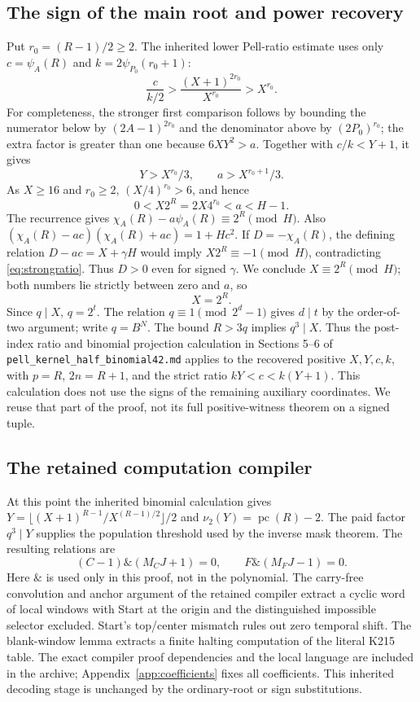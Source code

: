 \documentclass[11pt,a4paper]{article}
\theoremstyle{remark}\newtheorem{remark}[theorem]{Remark}
\newcommand{\pc}{\operatorname{pc}}
\newcommand{\src}[1]{\nolinkurl{#1}}
\begin{document}
\subsection{The sign of the main root and power recovery}
Put $r_0=(R-1)/2\ge2$. The inherited lower Pell-ratio estimate
uses only $c=\psi_A(R)$ and $k=2\psi_{P_0}(r_0+1)$:
\[
 \frac{c}{k/2}>
 \frac{(X+1)^{2r_0}}{X^{r_0}}>X^{r_0}.
\]
For completeness, the stronger first comparison follows by bounding
the numerator below by $(2A-1)^{2r_0}$ and the denominator above by
$(2P_0)^{r_0}$; the extra factor is greater than one because
$6XY^2>a$. Together with $c/k<Y+1$, it gives
\[
 Y>X^{r_0}/3,\qquad a>X^{r_0+1}/3.
\]
As $X\ge16$ and $r_0\ge2$, $(X/4)^{r_0}>6$, and hence
\begin{equation}
 0<X2^R=2X4^{r_0}<a<H-1.\label{eq:strongratio}
\end{equation}
The recurrence gives $\chi_A(R)-a\psi_A(R)\equiv2^R\pmod H$.
Also
$(\chi_A(R)-ac)(\chi_A(R)+ac)=1+Hc^2$.
If $D=-\chi_A(R)$, the defining relation
$D-ac=X+\gamma H$ would imply $X2^R\equiv-1\pmod H$,
contradicting \eqref{eq:strongratio}. Thus $D>0$ even for signed
$\gamma$. We conclude $X\equiv2^R\pmod H$; both numbers lie
strictly between zero and $a$, so
\[
 \boxed{X=2^R.}
\]
Since $q\mid X$, $q=2^t$. The relation $q\equiv1\pmod{2^d-1}$
gives $d\mid t$ by the order-of-two argument; write $q=B^N$.
The bound $R>3q$ implies $q^3\mid X$. Thus the post-index
ratio and binomial projection calculation in Sections 5--6 of
\src{pell_kernel_half_binomial42.md} applies to the recovered
positive $X,Y,c,k$, with $p=R$, $2n=R+1$, and the strict ratio
$kY<c<k(Y+1)$. This calculation does not use the signs of the
remaining auxiliary coordinates. We reuse that part of the proof,
not its full positive-witness theorem on a signed tuple.

\subsection{The retained computation compiler}
At this point the inherited binomial calculation gives
$Y=\lfloor (X+1)^{R-1}/X^{(R-1)/2}\rfloor/2$ and
$\nu_2(Y)=\pc(R)-2$. The paid factor $q^3\mid Y$ supplies the
population threshold used by the inverse mask theorem. The resulting
relations are
\[
 (C-1)\mathbin{\&}(M_CJ+1)=0,\qquad
 F\mathbin{\&}(M_FJ-1)=0.
\]
Here $\&$ is used only in this proof, not in the polynomial.
The carry-free convolution and anchor argument of the retained
compiler extract a cyclic word of local windows with Start at the
origin and the distinguished impossible selector excluded. Start's
top/center mismatch rules out zero temporal shift. The blank-window
lemma extracts a finite halting computation of the literal K215 table.
The exact compiler proof dependencies and the local language are
included in the archive; Appendix~\ref{app:coefficients} fixes all
coefficients. This inherited decoding stage is unchanged by the
ordinary-root or sign substitutions.
\end{document}
